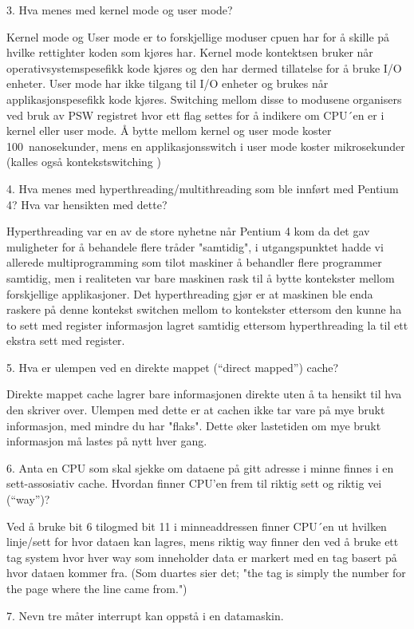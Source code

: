 3. Hva menes med kernel mode og user mode?

Kernel mode og User mode er to forskjellige moduser cpuen har for å skille på hvilke rettighter koden som kjøres har. Kernel mode kontektsen bruker når operativsystemspesefikk kode kjøres og den har dermed tillatelse for å bruke I/O enheter. User mode har ikke tilgang til I/O enheter og brukes når applikasjonspesefikk kode kjøres. Switching mellom disse to modusene organisers ved bruk av PSW registret hvor ett flag settes for å indikere om CPU´en er i kernel eller user mode. Å bytte mellom kernel og user mode koster 100~nanosekunder, mens en applikasjonsswitch i user mode koster mikrosekunder (kalles også kontekstswitching )

4. Hva menes med hyperthreading/multithreading som ble innført med Pentium 4? Hva var hensikten med dette?

Hyperthreading var en av de store nyhetne når Pentium 4 kom da det gav muligheter for å behandele flere tråder "samtidig", i utgangspunktet hadde vi allerede multiprogramming som tilot maskiner å behandler flere programmer samtidig, men i realiteten var bare maskinen rask til å bytte kontekster mellom forskjellige applikasjoner. Det hyperthreading gjør er at maskinen ble enda raskere på denne kontekst switchen mellom to kontekster ettersom den kunne ha to sett med register informasjon lagret samtidig ettersom hyperthreading la til ett ekstra sett med register. 

5. Hva er ulempen ved en direkte mappet (“direct mapped”) cache?

Direkte mappet cache lagrer bare informasjonen direkte uten å ta hensikt til hva den skriver over. Ulempen med dette er at cachen ikke tar vare på mye brukt informasjon, med mindre du har "flaks". Dette øker lastetiden om mye brukt informasjon må lastes på nytt hver gang.

6. Anta en CPU som skal sjekke om dataene på gitt adresse i minne finnes i en sett-assosiativ cache. Hvordan finner CPU’en frem til riktig sett og riktig vei (“way”)?

Ved å bruke bit 6 tilogmed bit 11 i minneaddressen finner CPU´en ut hvilken linje/sett for hvor dataen kan lagres, mens riktig way finner den ved å bruke ett tag system hvor hver way som inneholder data er markert med en tag basert på hvor dataen kommer fra. (Som duartes sier det; "the tag is simply the number for the page where the line came from.") 

7. Nevn tre måter interrupt kan oppstå i en datamaskin.

